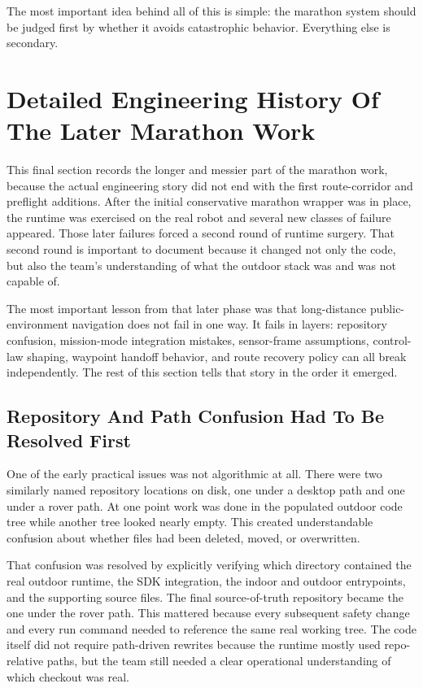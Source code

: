 \documentclass[11pt]{article}
\begin{document}
The most important idea behind all of this is simple: the marathon system should be judged first by whether it avoids catastrophic behavior. Everything else is secondary.


\section{Detailed Engineering History Of The Later Marathon Work}
This final section records the longer and messier part of the marathon work, because the actual engineering story did not end with the first route-corridor and preflight additions. After the initial conservative marathon wrapper was in place, the runtime was exercised on the real robot and several new classes of failure appeared. Those later failures forced a second round of runtime surgery. That second round is important to document because it changed not only the code, but also the team's understanding of what the outdoor stack was and was not capable of.

The most important lesson from that later phase was that long-distance public-environment navigation does not fail in one way. It fails in layers: repository confusion, mission-mode integration mistakes, sensor-frame assumptions, control-law shaping, waypoint handoff behavior, and route recovery policy can all break independently. The rest of this section tells that story in the order it emerged.

\subsection{Repository And Path Confusion Had To Be Resolved First}
One of the early practical issues was not algorithmic at all. There were two similarly named repository locations on disk, one under a desktop path and one under a rover path. At one point work was done in the populated outdoor code tree while another tree looked nearly empty. This created understandable confusion about whether files had been deleted, moved, or overwritten.

That confusion was resolved by explicitly verifying which directory contained the real outdoor runtime, the SDK integration, the indoor and outdoor entrypoints, and the supporting source files. The final source-of-truth repository became the one under the rover path. This mattered because every subsequent safety change and every run command needed to reference the same real working tree. The code itself did not require path-driven rewrites because the runtime mostly used repo-relative paths, but the team still needed a clear operational understanding of which checkout was real.
\end{document}
